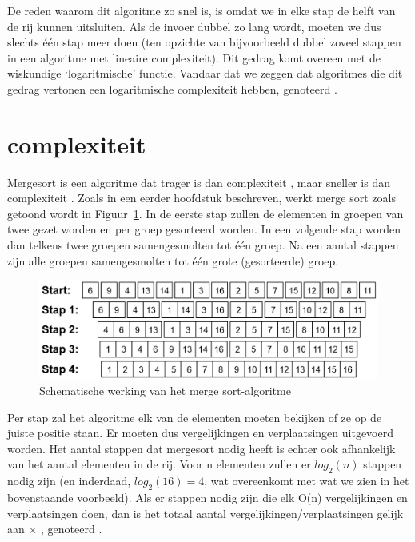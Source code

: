 De reden waarom dit algoritme zo snel is, is omdat we in elke stap de helft van de rij kunnen uitsluiten. Als de invoer dubbel zo lang wordt, moeten we dus slechts \'e\'en stap meer doen (ten opzichte van bijvoorbeeld dubbel zoveel stappen in een algoritme met lineaire complexiteit). Dit gedrag komt overeen met de wiskundige `logaritmische' functie. Vandaar dat we zeggen dat algoritmes die dit gedrag vertonen een logaritmische complexiteit hebben, genoteerd \compln.

\section{\compnln complexiteit}

Mergesort is een algoritme dat trager is dan complexiteit \compn, maar sneller is dan complexiteit \compnk. Zoals in een eerder hoofdstuk beschreven, werkt merge sort zoals getoond wordt in Figuur~\ref{fig:mergesort}. In de eerste stap zullen de elementen in groepen van twee gezet worden en per groep gesorteerd worden. In een volgende stap worden dan telkens twee groepen samengesmolten tot \'e\'en groep. Na een aantal stappen zijn alle groepen samengesmolten tot \'e\'en grote (gesorteerde) groep.

\begin{figure}
\centering
\includegraphics[scale=0.5]{Complexiteit/mergesort.png}
\caption{Schematische werking van het merge sort-algoritme}\label{fig:mergesort}
\end{figure}

Per stap zal het algoritme elk van de elementen moeten bekijken of ze op de juiste positie staan. Er moeten dus \compn vergelijkingen en verplaatsingen uitgevoerd worden. Het aantal stappen dat mergesort nodig heeft is echter ook afhankelijk van het aantal elementen in de rij. Voor n elementen zullen er $log_{2}(n)$ stappen nodig zijn (en inderdaad, $log_{2}(16) = 4$, wat overeenkomt met wat we zien in het bovenstaande voorbeeld). Als er \compln stappen nodig zijn die elk O(n) vergelijkingen en verplaatsingen doen, dan is het totaal aantal vergelijkingen/verplaatsingen gelijk aan \compln $\times$ \compn, genoteerd \compnln.

